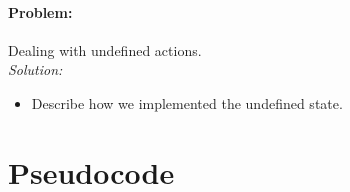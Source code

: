 \paragraph{Problem:}
Dealing with undefined actions.
\\\textit{Solution:}
\begin{itemize}
    \item Describe how we implemented the undefined state.
\end{itemize}




\section{Pseudocode}


